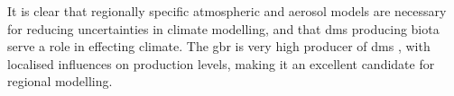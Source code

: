It is clear that regionally specific atmospheric and aerosol models are necessary for reducing uncertainties in climate modelling, and that \gls{dms} producing biota serve a role in effecting climate. The \gls{gbr} is very high producer of \gls{dms} \citep{jones:2005ez}, with localised influences on production levels, making it an excellent candidate for regional modelling.


